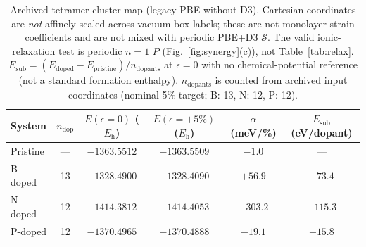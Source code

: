 
\begin{table}[t]
\caption{\label{tab:I}Archived tetramer cluster map (legacy PBE without D3). Cartesian coordinates are \emph{not} affinely scaled across vacuum-box labels; these are not monolayer strain coefficients and are not mixed with periodic PBE+D3 $\mathcal{S}$. The valid ionic-relaxation test is periodic $n{=}1$ $P$ (Fig.~\ref{fig:synergy}(c)), not Table~\ref{tab:relax}.
$E_{\mathrm{sub}}=(E_{\mathrm{doped}}-E_{\mathrm{pristine}})/n_{\mathrm{dopants}}$ at $\epsilon{=}0$ with no chemical-potential reference (not a standard formation enthalpy).
$n_{\mathrm{dopants}}$ is counted from archived input coordinates (nominal 5\% target; B: 13, N: 12, P: 12).}
\begin{ruledtabular}
\begin{tabular}{lccccc}
System & $n_{\mathrm{dop}}$ & $E(\epsilon{=}0)$ ($E_{\mathrm{h}}$) & $E(\epsilon{=}+5\%)$ ($E_{\mathrm{h}}$) & $\alpha$ (meV/\%) & $E_{\mathrm{sub}}$ (eV/dopant) \\
\hline
Pristine & --- & $-1363.5512$ & $-1363.5509$ & $-1.0$ & --- \\
B-doped & 13 & $-1328.4900$ & $-1328.4090$ & $+56.9$ & $+73.4$ \\
N-doped & 12 & $-1414.3812$ & $-1414.4053$ & $-303.2$ & $-115.3$ \\
P-doped & 12 & $-1370.4965$ & $-1370.4888$ & $-19.1$ & $-15.8$ \\
\end{tabular}
\end{ruledtabular}
\end{table}

